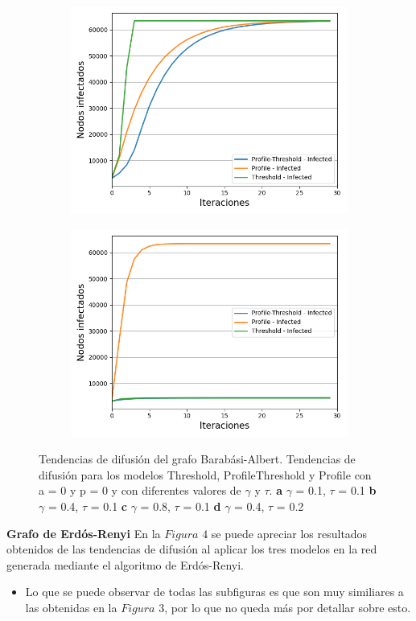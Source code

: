 \documentclass{article}
\begin{document}
\begin{figure}[!tbp]
\begin{subfigure}[b]{0.5\textwidth}
		\includegraphics[width=\textwidth]{../Images/Fig 1 c).png}
		\caption{}
		\label{fig:f3}
	\end{subfigure}
	\hfill
	\begin{subfigure}[b]{0.5\textwidth}
		\includegraphics[width=\textwidth]{../Images/Fig 1 d).png}
		\caption{}
		\label{fig:f4}
	\end{subfigure}
	\label{fig:FIG1}
	\caption{Tendencias de difusión del grafo Barabási-Albert. Tendencias de difusión para los modelos Threshold, ProfileThreshold y Profile con a = 0 y p = 0 y con diferentes valores de $\gamma$ y $\tau$. \textbf{a} $\gamma$ = 0.1, $\tau$ = 0.1 \textbf{b} $\gamma$ = 0.4, $\tau$ = 0.1 \textbf{c} $\gamma$ = 0.8, $\tau$ = 0.1 \textbf{d} $\gamma$ = 0.4, $\tau$ = 0.2}
\end{figure}
\newpage
\textbf{Grafo de Erdós-Renyi}
En la $Figura$ $4$ se puede apreciar los resultados obtenidos de las tendencias de difusión al aplicar los tres modelos en la red generada mediante el algoritmo de Erdós-Renyi. 
\begin{itemize}
	\item Lo que se puede observar de todas las subfiguras es que son muy similiares a las obtenidas en la $Figura$ $3$, por lo que no queda más por detallar sobre esto.
\end{itemize}
\end{document}
